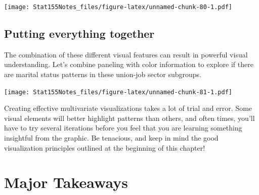 \documentclass[]{book}
\newenvironment{Shaded}{\begin{snugshade}}{\end{snugshade}}
\newcommand{\CommentTok}[1]{\textcolor[rgb]{0.56,0.35,0.01}{\textit{#1}}}
\newcommand{\DataTypeTok}[1]{\textcolor[rgb]{0.13,0.29,0.53}{#1}}
\newcommand{\KeywordTok}[1]{\textcolor[rgb]{0.13,0.29,0.53}{\textbf{#1}}}
\newcommand{\NormalTok}[1]{#1}
\newcommand{\OperatorTok}[1]{\textcolor[rgb]{0.81,0.36,0.00}{\textbf{#1}}}
\newcommand{\StringTok}[1]{\textcolor[rgb]{0.31,0.60,0.02}{#1}}
\begin{document}
\texttt{[image: Stat155Notes\_files/figure-latex/unnamed-chunk-80-1.pdf]}

\hypertarget{putting-everything-together}{%
\subsection{Putting everything together}\label{putting-everything-together}}

The combination of these different visual features can result in powerful visual understanding. Let's combine paneling with color information to explore if there are marital status patterns in these union-job sector subgroups.

\begin{Shaded}
\end{Shaded}

\texttt{[image: Stat155Notes\_files/figure-latex/unnamed-chunk-81-1.pdf]}

Creating effective multivariate visualizations takes a lot of trial and error. Some visual elements will better highlight patterns than others, and often times, you'll have to try several iterations before you feel that you are learning something insightful from the graphic. Be tenacious, and keep in mind the good visualization principles outlined at the beginning of this chapter!

\hypertarget{major-takeaways-1}{%
\section{Major Takeaways}\label{major-takeaways-1}}
\end{document}

